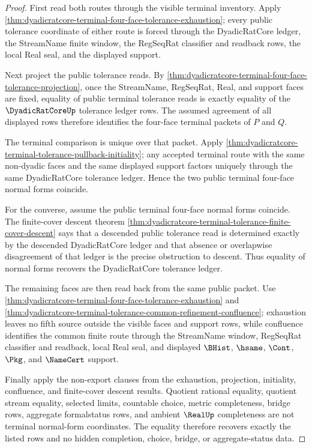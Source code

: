 \begin{proof}
First read both routes through the visible terminal inventory. Apply \autoref{thm:dyadicratcore-terminal-four-face-tolerance-exhaustion}; every public tolerance coordinate of either route is forced through the DyadicRatCore ledger, the StreamName finite window, the RegSeqRat classifier and readback rows, the local Real seal, and the displayed support.

Next project the public tolerance reads. By \autoref{thm:dyadicratcore-terminal-four-face-tolerance-projection}, once the StreamName, RegSeqRat, Real, and support faces are fixed, equality of public terminal tolerance reads is exactly equality of the $\DyadicRatCoreUp$ tolerance ledger rows. The assumed agreement of all displayed rows therefore identifies the four-face terminal packets of $P$ and $Q$.

The terminal comparison is unique over that packet. Apply \autoref{thm:dyadicratcore-terminal-tolerance-pullback-initiality}; any accepted terminal route with the same non-dyadic faces and the same displayed support factors uniquely through the same DyadicRatCore tolerance ledger. Hence the two public terminal four-face normal forms coincide.

For the converse, assume the public terminal four-face normal forms coincide. The finite-cover descent theorem \autoref{thm:dyadicratcore-terminal-tolerance-finite-cover-descent} says that a descended public tolerance read is determined exactly by the descended DyadicRatCore ledger and that absence or overlapwise disagreement of that ledger is the precise obstruction to descent. Thus equality of normal forms recovers the DyadicRatCore tolerance ledger.

The remaining faces are then read back from the same public packet. Use \autoref{thm:dyadicratcore-terminal-four-face-tolerance-exhaustion} and \autoref{thm:dyadicratcore-terminal-tolerance-common-refinement-confluence}; exhaustion leaves no fifth source outside the visible faces and support rows, while confluence identifies the common finite route through the StreamName window, RegSeqRat classifier and readback, local Real seal, and displayed $\BHist$, $\hsame$, $\Cont$, $\Pkg$, and $\NameCert$ support.

Finally apply the non-export clauses from the exhaustion, projection, initiality, confluence, and finite-cover descent results. Quotient rational equality, quotient stream equality, selected limits, countable choice, metric completeness, bridge rows, aggregate formalstatus rows, and ambient $\RealUp$ completeness are not terminal normal-form coordinates. The equality therefore recovers exactly the listed rows and no hidden completion, choice, bridge, or aggregate-status data.
\end{proof}


